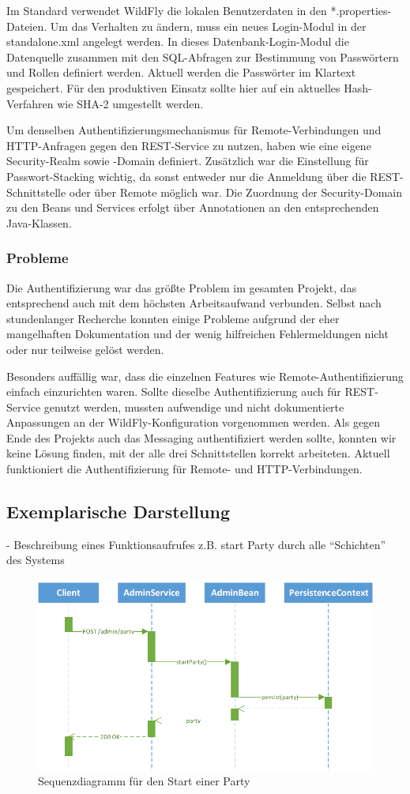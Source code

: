 Im Standard verwendet WildFly die lokalen Benutzerdaten in den *.properties-Dateien. Um das Verhalten zu ändern, muss ein neues Login-Modul in der standalone.xml angelegt werden. In dieses Datenbank-Login-Modul die Datenquelle zusammen mit den SQL-Abfragen zur Bestimmung von Passwörtern und Rollen definiert werden. Aktuell werden die Passwörter im Klartext gespeichert. Für den produktiven Einsatz sollte hier auf ein aktuelles Hash-Verfahren wie SHA-2 umgestellt werden.

Um denselben Authentifizierungsmechanismus für Remote-Verbindungen und HTTP-Anfragen gegen den REST-Service zu nutzen, haben wie eine eigene Security-Realm sowie -Domain definiert. Zusätzlich war die Einstellung für Passwort-Stacking wichtig, da sonst entweder nur die Anmeldung über die REST-Schnittstelle oder über Remote möglich war. Die Zuordnung der Security-Domain zu den Beans und Services erfolgt über Annotationen an den entsprechenden Java-Klassen. 

\subsubsection{Probleme}
Die Authentifizierung war das größte Problem im gesamten Projekt, das entsprechend auch mit dem höchsten Arbeitsaufwand verbunden. Selbst nach stundenlanger Recherche konnten einige Probleme aufgrund der eher mangelhaften Dokumentation und der wenig hilfreichen Fehlermeldungen nicht oder nur teilweise gelöst werden.

Besonders auffällig war, dass die einzelnen Features wie Remote-Authentifizierung einfach einzurichten waren. Sollte dieselbe Authentifizierung auch für REST-Service genutzt werden, mussten aufwendige und nicht dokumentierte Anpassungen an der WildFly-Konfiguration vorgenommen werden. Als gegen Ende des Projekts auch das Messaging authentifiziert werden sollte, konnten wir keine Lösung finden, mit der alle drei Schnittstellen korrekt arbeiteten. Aktuell funktioniert die Authentifizierung für Remote- und HTTP-Verbindungen. 


\subsection{Exemplarische Darstellung}
- Beschreibung eines Funktionsaufrufes z.B. start Party durch alle "`Schichten"' des Systems

\begin{figure}[tbh]
\centering
\includegraphics[width=1.0\linewidth]{Bilder/AufrufSequenz}
\caption{Sequenzdiagramm für den Start einer Party}
\label{fig:AufrufSequenz}
\end{figure}





